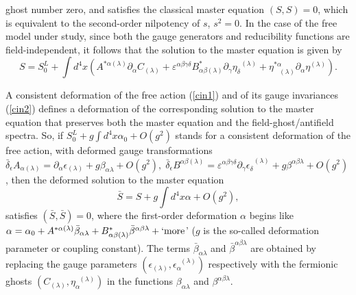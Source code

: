 \documentclass[a4paper,12pt]{article}
\begin{document}
ghost number zero, and satisfies the classical master equation $\left(
S,S\right) =0$, which is equivalent to the second-order nilpotency of $s$, $%
s^{2}=0$. In the case of the free model under study, since both the gauge
generators and reducibility functions are field-independent, it follows that
the solution to the master equation is given by
\begin{equation}
S=S_{0}^{L}+\int d^{4}x\left( A^{*\alpha (\lambda )}\partial _{\alpha
}C_{(\lambda )}+\varepsilon ^{\alpha \beta \gamma \delta }B_{\alpha \beta
(\lambda )}^{*}\partial _{\gamma }\eta _{\delta }^{\;\;(\lambda )}+\eta
_{\;\;\;(\lambda )}^{*\alpha }\partial _{\alpha }\eta ^{(\lambda )}\right) .
\label{cin3}
\end{equation}

A consistent deformation of the free action (\ref{cin1}) and of its gauge
invariances (\ref{cin2}) defines a deformation of the corresponding solution
to the master equation that preserves both the master equation and the
field-ghost/antifield spectra. So, if $S_{0}^{L}+g\int d^{4}x\alpha
_{0}+O\left( g^{2}\right) $ stands for a consistent deformation of the free
action, with deformed gauge transformations $\bar{\delta}_{\epsilon
}A_{\alpha (\lambda )}=\partial _{\alpha }\epsilon _{(\lambda )}+g\beta
_{\alpha \lambda }+O\left( g^{2}\right) ,\;\bar{\delta}_{\epsilon }B^{\alpha
\beta (\lambda )}=\varepsilon ^{\alpha \beta \gamma \delta }\partial
_{\gamma }\epsilon _{\delta }^{\;\;(\lambda )}+g\beta ^{\alpha \beta \lambda
}+O\left( g^{2}\right) $, then the deformed solution to the master equation
\begin{equation}
\bar{S}=S+g\int d^{4}x\alpha +O\left( g^{2}\right) ,  \label{cin3a}
\end{equation}
satisfies $\left( \bar{S},\bar{S}\right) =0$, where the first-order
deformation $\alpha $ begins like $\alpha =\alpha _{0}+A^{*\alpha (\lambda )}%
\bar{\beta}_{\alpha \lambda }+B_{\alpha \beta (\lambda )}^{*}\bar{\beta}%
^{\alpha \beta \lambda }+`\mathrm{more}$' ($g$ is the so-called deformation
parameter or coupling constant). The terms $\bar{\beta}_{\alpha \lambda }$%
and $\bar{\beta}^{\alpha \beta \lambda }$ are obtained by replacing the
gauge parameters $\left( \epsilon _{(\lambda )},\epsilon _{\alpha
}^{\;\;(\lambda )}\right) $ respectively with the fermionic ghosts $\left(
C_{(\lambda )},\eta _{\alpha }^{\;\;(\lambda )}\right) $ in the functions $%
\beta _{\alpha \lambda }$ and $\beta ^{\alpha \beta \lambda }$.
\end{document}
